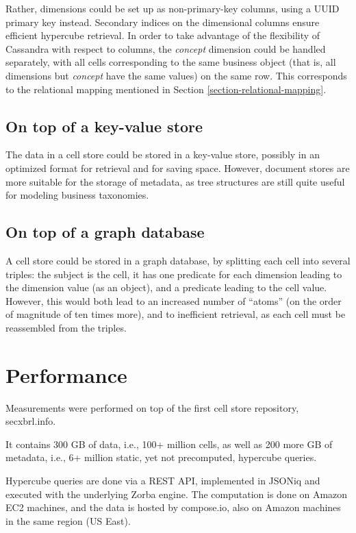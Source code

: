 \documentclass{acm_proc_article-sp}
\begin{document}
Rather, dimensions could be set up as non-primary-key columns, using a UUID primary key instead. Secondary indices on the dimensional columns ensure efficient hypercube retrieval. In order to take advantage of the flexibility of Cassandra with respect to columns, the \emph{concept} dimension could be handled separately, with all cells corresponding to the same business object (that is, all dimensions but \emph{concept} have the same values) on the same row. This corresponds to the relational mapping mentioned in Section \ref{section-relational-mapping}.

\subsection{On top of a key-value store}

The data in a cell store could be stored in a key-value store, possibly in an optimized format for retrieval and for saving space. However, document stores are more suitable for the storage of metadata, as tree structures are still quite useful for modeling business taxonomies.

\subsection{On top of a graph database}

A cell store could be stored in a graph database, by splitting each cell into several triples: the subject is the cell, it has one predicate for each dimension leading to the dimension value (as an object), and a predicate leading to the cell value. However, this would both lead to an increased number of ``atoms'' (on the order of magnitude of ten times more), and to inefficient retrieval, as each cell must be reassembled from the triples.

\section{Performance}
\label{section-performance}
Measurements were performed on top of the first cell store repository, secxbrl.info.

It contains 300 GB of data, i.e., 100+ million cells, as well as 200 more GB of metadata, i.e., 6+ million static, yet not precomputed, hypercube queries.

Hypercube queries are done via a REST API, implemented in JSONiq and executed with the underlying Zorba engine. The computation is done on Amazon EC2 machines, and the data is hosted by compose.io, also on Amazon machines in the same region (US East).
\end{document}
